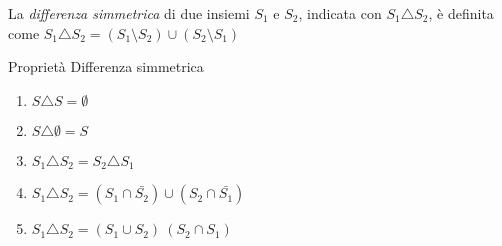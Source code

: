 La \textit{differenza simmetrica} di due insiemi $S_1$ e $S_2$, indicata con $S_1 \triangle S_2$,
è definita come $S_1 \triangle S_2 = (S_1 \setminus S_2) \cup (S_2 \setminus S_1) $

\begin{prop}
Proprietà Differenza simmetrica
\begin{enumerate}
  \item $S \triangle S = \emptyset$
  \item $S \triangle \emptyset = S$
  \item $S_1 \triangle S_2 = S_2 \triangle S_1$
  \item $S_1 \triangle S_2 = (S_1 \cap \bar{S_2}) \cup (S_2 \cap \bar{S_1})$
  \item $S_1 \triangle S_2 = (S_1 \cup S_2) \ (S_2 \cap S_1)$
\end{enumerate}
\end{prop}
